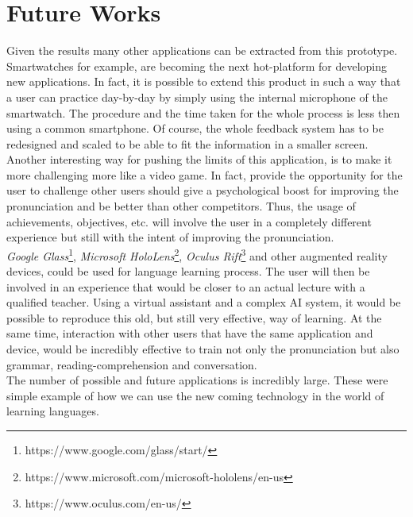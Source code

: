 \chapter{Future Works}
\label{ch:Future Works}

Given the results many other applications can be extracted from this prototype. Smartwatches for example, are becoming the next hot-platform for developing new applications. In fact, it is possible to extend this product in such a way that a user can practice day-by-day by simply using the internal microphone of the smartwatch. The procedure and the time taken for the whole process is less then using a common smartphone. Of course, the whole feedback system has to be redesigned and scaled to be able to fit the information in a smaller screen. \\

\noindent Another interesting way for pushing the limits of this application, is to make it more challenging more like a video game. In fact, provide the opportunity for the user to challenge other users should give a psychological boost for improving the pronunciation and be better than other competitors. Thus, the usage of achievements, objectives, etc. will involve the user in a completely different experience but still with the intent of improving the pronunciation. \\

\noindent \textit{Google Glass}\footnote{https://www.google.com/glass/start/}, \textit{Microsoft HoloLens}\footnote{https://www.microsoft.com/microsoft-hololens/en-us}, \textit{Oculus Rift}\footnote{https://www.oculus.com/en-us/} and other augmented reality devices, could be used for language learning process. The user will then be involved in an experience that would be closer to an actual lecture with a qualified teacher. Using a virtual assistant and a complex AI system, it would be possible to reproduce this old, but still very effective, way of learning. At the same time, interaction with other users that have the same application and device, would be incredibly effective to train not only the pronunciation but also grammar, reading-comprehension and conversation. \\

\noindent The number of possible and future applications is incredibly large. These were simple example of how we can use the new coming technology in the world of learning languages.

